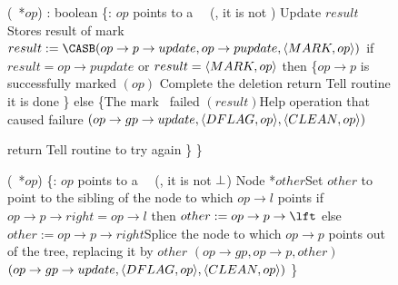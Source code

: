 \begin{figure*}
\begin{code}
		(\DFlag\ *$op$) : boolean \{\ul
		\n   {}:  $op$ points to a \DFlag\ \record\  (\ie, it is not \NULL)\nlc%
		Update $result$ \tabtabcom Stores result of mark \CASB\bl\nlc
		$result := \CASB(op\rightarrow p\rightarrow update, op\rightarrow pupdate, \langle \mk, op\rangle)$ \label{mark-cas}\nlc     
		if $result = op\rightarrow pupdate$ or $result = \langle M\scriptsize ARK \normalsize, op\rangle$ then \label{checkmark}\{\tabtabcom $op\rightarrow p$ is successfully marked\nlc
		\n          {}$(op)$ \label{call-hm1} \tabtabcom Complete the deletion\nlc
		return \TRUE\tabtabcom Tell  routine it is done\nlc
		\p       \}\nlc
		else \{\tabtabcom The mark \CASB\ failed \nlc
		\n              
		$(result)$\label{help-after-failed-mark}\tabtabcom Help operation that caused failure\nlc
		\CASB$(op\rightarrow gp\rightarrow update, \langle DF\scriptsize LAG \normalsize, op\rangle, \langle C\scriptsize LEAN \normalsize, op\rangle)$ \label{backtrack-cas}\nlc
		
		return \FALSE\tabtabcom Tell  routine to try again\nlc
		\p       \}\nlc
		\p
		\}\bl
		\nlc
		
		(\DFlag\ *$op$) \{\ul
		\n   {}:  $op$ points to a \DFlag\ \record\  (\ie, it is not $\perp$)\nlc
		Node *$other$\bl\ul
		\com Set $other$ to point to the sibling of the node to which  $op\rightarrow l$ points \nlc
		if $op\rightarrow p\rightarrow right = op\rightarrow l$ then $other := op\rightarrow p \rightarrow \lft$ else $other:=op\rightarrow p\rightarrow right$\label{read-other}\ul 
		\com Splice the node to which $op\rightarrow p$ points out of the tree, replacing it by $other$\nlc
		$(op\rightarrow gp, op\rightarrow p, other)$ \label{dchild-cas}\nlc
		\CASB$(op\rightarrow gp\rightarrow update, \langle DF\scriptsize LAG \normalsize, op\rangle, \langle C\scriptsize LEAN \normalsize, op\rangle)$ \label{dunflag-cas}\nlc
		\p
		\}\bl\nlc
		

\end{code}
\end{figure*}
